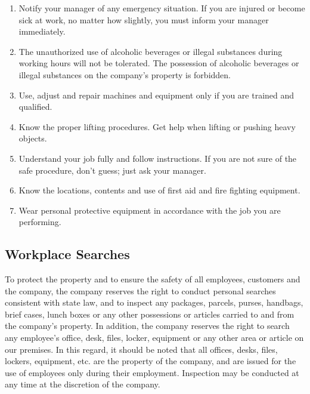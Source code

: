 \documentclass{book}
\begin{document}
\begin{enumerate}

\item Notify your manager of any emergency situation. If you are injured or become sick at work, no matter how slightly, you must inform your manager immediately.

\item The unauthorized use of alcoholic beverages or illegal substances during working hours will not be tolerated. The possession of alcoholic beverages or illegal substances on the company's property is forbidden.

\item Use, adjust and repair machines and equipment only if you are trained and qualified.

\item Know the proper lifting procedures. Get help when lifting or pushing heavy objects.

\item Understand your job fully and follow instructions. If you are not sure of the safe procedure, don't guess; just ask your manager.

\item Know the locations, contents and use of first aid and fire fighting equipment.

\item Wear personal protective equipment in accordance with the job you are performing.

\end{enumerate}

\subsection{Workplace Searches}

To protect the property and to ensure the safety of all employees, customers and the company, the company reserves the right to conduct personal searches consistent with state law, and to inspect any packages, parcels, purses, handbags, brief cases, lunch boxes or any other possessions or articles carried to and from the company's property. In addition, the company reserves the right to search any employee's office, desk, files, locker, equipment or any other area or article on our premises. In this regard, it should be noted that all offices, desks, files, lockers, equipment, etc. are the property of the company, and are issued for the use of employees only during their employment. Inspection may be conducted at any time at the discretion of the company.
\end{document}
